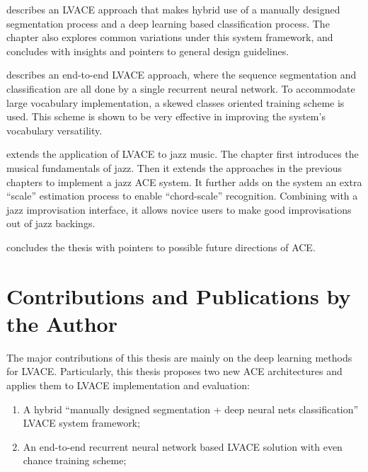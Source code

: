  describes an LVACE approach that makes hybrid use of a manually designed segmentation process and a deep learning based classification process. The chapter also explores common variations under this system framework, and concludes with insights and pointers to general design guidelines.

 describes an end-to-end LVACE approach, where the sequence segmentation and classification are all done by a single recurrent neural network. To accommodate large vocabulary implementation, a skewed classes oriented training scheme is used. This scheme is shown to be very effective in improving the system's vocabulary versatility.

 extends the application of LVACE to jazz music. The chapter first introduces the musical fundamentals of jazz. Then it extends the approaches in the previous chapters to implement a jazz ACE system. It further adds on the system an extra ``scale'' estimation process to enable ``chord-scale'' recognition. Combining with a jazz improvisation interface, it allows novice users to make good improvisations out of jazz backings.

 concludes the thesis with pointers to possible future directions of ACE.


\section{Contributions and Publications by the Author} \label{sec:1-contribution}
The major contributions of this thesis are mainly on the deep learning methods for LVACE. Particularly, this thesis proposes two new ACE architectures and applies them to LVACE implementation and evaluation:
\begin{enumerate}
\item A hybrid ``manually designed segmentation + deep neural nets classification'' LVACE system framework;
\item An end-to-end recurrent neural network based LVACE solution with even chance training scheme;
\end{enumerate}

